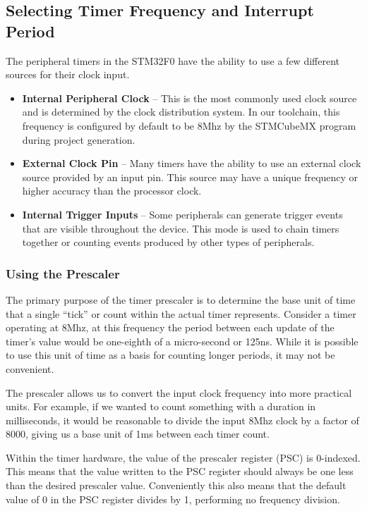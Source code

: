 \documentclass[openany,11pt,fleqn]{book} %
\begin{document}
    \subsection{Selecting Timer Frequency and Interrupt Period}	
    The peripheral timers in the STM32F0 have the ability to use a few different sources for their clock input. 
    \begin{itemize}
        \item\textbf{Internal Peripheral Clock} -- This is the most commonly used clock source and is determined by the clock distribution system. In our toolchain, this frequency is configured by default to be 8Mhz by the STMCubeMX program during project generation. 
        \item\textbf{External Clock Pin} -- Many timers have the ability to use an external clock source provided by an input pin. This source may have a unique frequency or higher accuracy than the processor clock.
        \item\textbf{Internal Trigger Inputs} -- Some peripherals can generate trigger events that are visible throughout the device. This mode is used to chain timers together or counting events produced by other types of peripherals.
    \end{itemize}
 
 
    \subsubsection{Using the Prescaler}
      
        The primary purpose of the timer prescaler is to determine the base unit of time that a single ``tick'' or count within the actual timer represents. Consider a timer operating at 8Mhz, at this frequency the period between each update of the timer's value would be one-eighth of a micro-second or 125ns. While it is possible to use this unit of time as a basis for counting longer periods, it may not be convenient. 
        
        The prescaler allows us to convert the input clock frequency into more practical units. For example, if we wanted to count something with a duration in milliseconds, it would be reasonable to divide the input 8Mhz clock by a factor of 8000, giving us a base unit of 1ms between each timer count. 
        
        Within the timer hardware, the value of the prescaler register (PSC) is 0-indexed. This means that the value written to the PSC register should always be one less than the desired prescaler value. Conveniently this also means that the default value of 0 in the PSC register divides by 1, performing no frequency division.  
\end{document}

